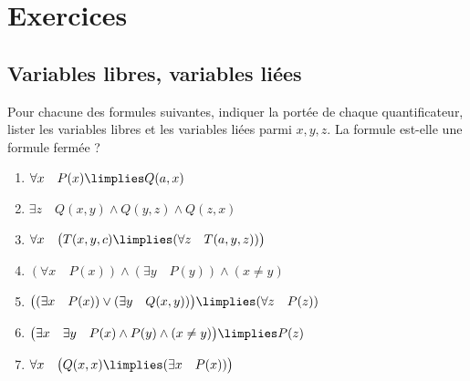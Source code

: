 \documentclass[11pt,class=report,crop=false]{standalone}
\begin{document}
\section*{Exercices}

\subsection*{Variables libres, variables liées}

\begin{exercicecours}
Pour chacune des formules suivantes, indiquer la portée de chaque quantificateur, lister les variables libres et les variables liées parmi $x,y,z$. La formule est-elle une formule fermée ?
\begin{enumerate}
	\item $\forall x \quad P(x) \limplies Q(a,x)$
	
	\item $\exists z \quad Q(x,y) \land Q(y,z) \land Q(z,x)$
	
	\item $\forall x \quad  \big( T(x,y,c) \limplies (\forall z \quad T(a,y,z)) \big)$
	
	\item $(\forall x \quad P(x)) \land (\exists y \quad P(y)) \land (x \neq y)$
	
	\item $\big( (\exists x \quad P(x)) \lor (\exists y \quad Q(x,y)) \big) \limplies (\forall z \quad P(z))$
	
	\item $\big(\exists x \quad \exists y \quad P(x) \land P(y) \land (x \neq y) \big) \limplies P(z)$
	
	\item $\forall x \quad \big( Q(x,x) \limplies (\exists x \quad P(x)) \big)$
\end{enumerate}
\end{exercicecours}
\end{document}
